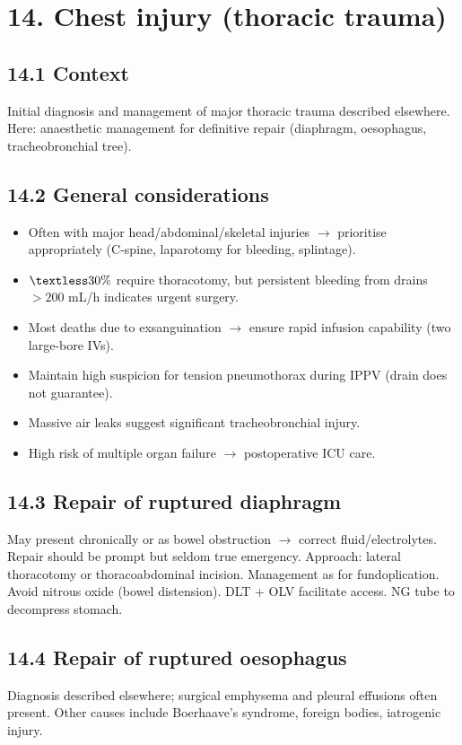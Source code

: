 \documentclass[11pt,a4paper]{article}
\begin{document}
\section{14. Chest injury (thoracic trauma)}

\subsection{14.1 Context}
Initial diagnosis and management of major thoracic trauma described elsewhere. Here: anaesthetic management for definitive repair (diaphragm, oesophagus, tracheobronchial tree).

\subsection{14.2 General considerations}
\begin{itemize}[leftmargin=*, itemsep=2pt]
  \item Often with major head/abdominal/skeletal injuries \(\rightarrow\) prioritise appropriately (C-spine, laparotomy for bleeding, splintage).
  \item \(\textless 30\%\) require thoracotomy, but persistent bleeding from drains \(>200\) mL/h indicates urgent surgery.
  \item Most deaths due to exsanguination \(\rightarrow\) ensure rapid infusion capability (two large-bore IVs).
  \item Maintain high suspicion for tension pneumothorax during IPPV (drain does not guarantee).
  \item Massive air leaks suggest significant tracheobronchial injury.
  \item High risk of multiple organ failure \(\rightarrow\) postoperative ICU care.
\end{itemize}

\subsection{14.3 Repair of ruptured diaphragm}
May present chronically or as bowel obstruction \(\rightarrow\) correct fluid/electrolytes. Repair should be prompt but seldom true emergency. Approach: lateral thoracotomy or thoracoabdominal incision. Management as for fundoplication. Avoid nitrous oxide (bowel distension). DLT + OLV facilitate access. NG tube to decompress stomach.

\subsection{14.4 Repair of ruptured oesophagus}
Diagnosis described elsewhere; surgical emphysema and pleural effusions often present. Other causes include Boerhaave's syndrome, foreign bodies, iatrogenic injury.
\end{document}
